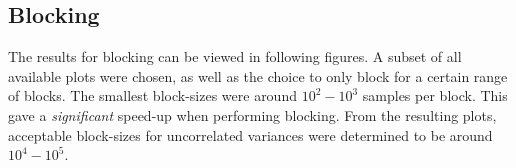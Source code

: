 \documentclass[11pt]{article}
\begin{document}
\begin{table}[H]
	\small
	\centering
	\caption{Importance sampling results together with energies and variances obtained without importance sampling. Energies are in atomic units.}
	\label{tab:imp-sampling}
\end{table}

\subsection{Blocking}
The results for blocking can be viewed in following figures. A subset of all available plots were chosen, as well as the choice to only block for a certain range of blocks. The smallest block-sizes were around $10^2-10^3$ samples per block. This gave a \textit{significant} speed-up when performing blocking. From the resulting plots, acceptable block-sizes for uncorrelated variances were determined to be around $10^4-10^5$.
\end{document}
